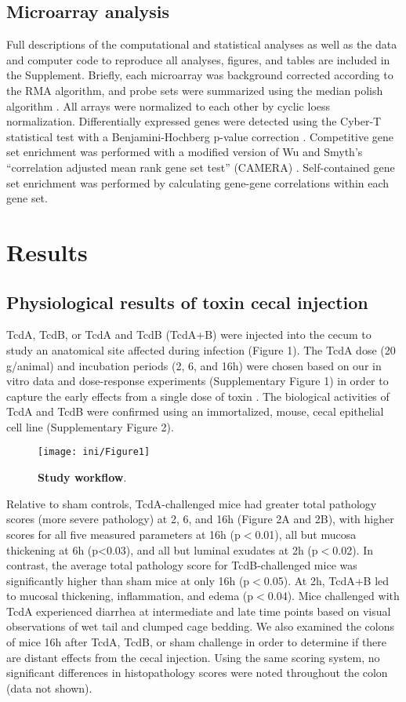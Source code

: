 \subsection{ Microarray analysis }
Full descriptions of the computational and statistical analyses as well as the data and computer code to reproduce all analyses, figures, and tables are included in the Supplement. Briefly, each microarray was background corrected according to the RMA algorithm, and probe sets were summarized using the median polish algorithm \cite{Irizarry:2003ge}. All arrays were normalized to each other by cyclic loess normalization. Differentially expressed genes were detected using the Cyber-T statistical test with a Benjamini-Hochberg p-value correction \cite{Baldi:2001gc}. Competitive gene set enrichment was performed with a modified version of Wu and Smyth’s ``correlation adjusted mean rank gene set test'' (CAMERA) \cite{Wu:2012kp}. Self-contained gene set enrichment was performed by calculating gene-gene correlations within each gene set.

\section{Results}

\subsection{ Physiological results of toxin cecal injection }
TcdA, TcdB, or TcdA and TcdB (TcdA+B) were injected into the cecum to study an anatomical site affected during infection (Figure 1). The TcdA dose (20 \textmu{}g/animal) and incubation periods (2, 6, and 16h) were chosen based on our in vitro data and dose-response experiments (Supplementary Figure 1) in order to capture the early effects from a single dose of toxin \cite{DAuria:2012bd}. The biological activities of TcdA and TcdB were confirmed using an immortalized, mouse, cecal epithelial cell line (Supplementary Figure 2).

\begin{figure}[h!]
  \centering
  \texttt{[image: ini/Figure1]}
  \caption[Study workflow]{
       \textbf{Study workflow}.
  }
  \label{ini:fig1}
\end{figure}

Relative to sham controls, TcdA-challenged mice had greater total pathology scores (more severe pathology) at 2, 6, and 16h (Figure 2A and 2B), with higher scores for all five measured parameters at 16h (p$<$0.01), all but mucosa thickening at 6h (p<0.03), and all but luminal exudates at 2h (p$<$0.02). In contrast, the average total pathology score for TcdB-challenged mice was significantly higher than sham mice at only 16h (p$<$0.05). At 2h, TcdA+B led to mucosal thickening, inflammation, and edema (p$<$0.04). Mice challenged with TcdA experienced diarrhea at intermediate and late time points based on visual observations of wet tail and clumped cage bedding. We also examined the colons of mice 16h after TcdA, TcdB, or sham challenge in order to determine if there are distant effects from the cecal injection. Using the same scoring system, no significant differences in histopathology scores were noted throughout the colon (data not shown).

